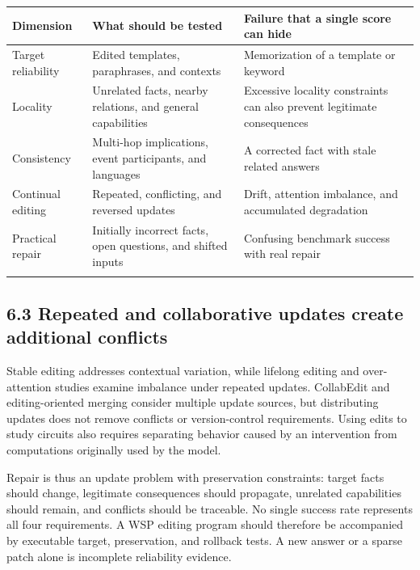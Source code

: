 \begin{longtable}{>{\raggedright\arraybackslash}p{4.85cm}>{\raggedright\arraybackslash}p{4.85cm}>{\raggedright\arraybackslash}p{4.85cm}}

\toprule

\textbf{Dimension} & \textbf{What should be tested} & \textbf{Failure that a single score can hide}\\\midrule\endhead

Target reliability & Edited templates, paraphrases, and contexts & Memorization of a template or keyword\\\addlinespace[3pt]

Locality & Unrelated facts, nearby relations, and general capabilities & Excessive locality constraints can also prevent legitimate consequences\\\addlinespace[3pt]

Consistency & Multi-hop implications, event participants, and languages & A corrected fact with stale related answers\\\addlinespace[3pt]

Continual editing & Repeated, conflicting, and reversed updates & Drift, attention imbalance, and accumulated degradation\\\addlinespace[3pt]

Practical repair & Initially incorrect facts, open questions, and shifted inputs & Confusing benchmark success with real repair\\\addlinespace[3pt]

\bottomrule\end{longtable}\endgroup

\subsection*{6.3 Repeated and collaborative updates create additional conflicts}

Stable editing addresses contextual variation, while lifelong editing and over-attention studies examine imbalance under repeated updates.\cite{r24,r36,r37} CollabEdit and editing-oriented merging consider multiple update sources, but distributing updates does not remove conflicts or version-control requirements.\cite{r32,r41} Using edits to study circuits also requires separating behavior caused by an intervention from computations originally used by the model.\cite{r29}


Repair is thus an update problem with preservation constraints: target facts should change, legitimate consequences should propagate, unrelated capabilities should remain, and conflicts should be traceable. No single success rate represents all four requirements.\cite{r19} A WSP editing program should therefore be accompanied by executable target, preservation, and rollback tests. A new answer or a sparse patch alone is incomplete reliability evidence.


